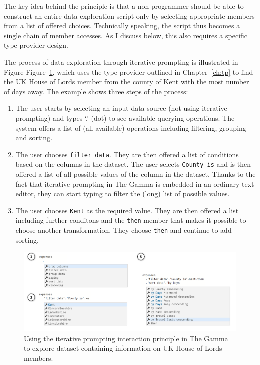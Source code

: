 \documentclass[fleqn,11pt]{report}
\theoremstyle{definition}
\newenvironment{nenumerate}
{ \vspace{-0.4em}
  \begin{enumerate}
    \setlength{\itemsep}{5pt}
    \setlength{\parskip}{0pt}
    \setlength{\parsep}{0pt} }
{ \end{enumerate}
  \vspace{-0.4em} }
\begin{document}
The key idea behind the principle is that a non-programmer should be able to construct
an entire data exploration script only by selecting appropriate members from a list of
offered choices. Technically speaking, the script thus becomes a single chain of member
accesses. As I discuss below, this also requires a specific type provider design.

The process of data exploration through iterative prompting is illustrated in Figure
Figure~\ref{fig:iterative}, which uses the type provider outlined in Chapter~\ref{ch:tp} to
find the UK House of Lords member from the county of Kent with the most number of days away.
The example shows three steps of the process:

\begin{nenumerate}
\item The user starts by selecting an input data source (not using iterative prompting)
  and types `.' (dot) to see available querying operations. The system offers a list of
  (all available) operations including filtering, grouping and sorting.

\item The user chooses \texttt{filter data}. They are then offered a list of conditions
  based on the columns in the dataset. The user selects \texttt{County is} and is then
  offered a list of all possible values of the column in the dataset. Thanks to the fact
  that iterative prompting in The Gamma is embedded in an ordinary text editor, they
  can start typing to filter the (long) list of possible values.

\item The user chooses \texttt{Kent} as the required value. They are then offered a list
  including further conditons and the \texttt{then} member that makes it possible to choose
  another transformation. They choose \texttt{then} and continue to add sorting.
\end{nenumerate}

\begin{figure}[t]
\hspace{-2em}
\includegraphics[scale=0.45]{img/iterative.png}
\caption{Using the iterative prompting interaction principle in The Gamma to explore
dataset containing information on UK House of Lords members.}
\label{fig:iterative}
\end{figure}
\end{document}

